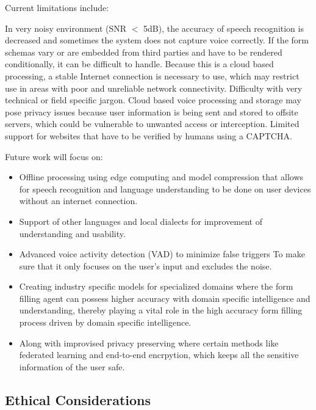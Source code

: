 \documentclass[conference]{IEEEtran}
\begin{document}
Current limitations include:

\begin{itemize}
In very noisy environment (SNR $<$ 5dB), the accuracy of speech recognition is decreased and sometimes the system does not capture voice correctly.
If the form schemas vary or are embedded from third parties and have to be rendered conditionally, it can be difficult to handle.
Because this is a cloud based processing, a stable Internet connection is necessary to use, which may restrict use in areas with poor and unreliable network connectivity.
Difficulty with very technical or field specific jargon.
Cloud based voice processing and storage may pose privacy issues because user information is being sent and stored to offsite servers, which could be vulnerable to unwanted access or interception.
Limited support for websites that have to be verified by humans using a CAPTCHA.

\end{itemize}

Future work will focus on:

\begin{itemize}
\item Offline processing using edge computing and model compression that allows for speech recognition and language understanding to be done on user devices without an internet connection.
\item Support of other languages and local dialects for improvement of understanding and usability.
\item Advanced voice activity detection (VAD) to minimize false triggers To make sure that it only focuses on the user's input and excludes the noise.
\item Creating industry specific models for specialized domains where the form filling agent can possess higher accuracy with domain specific intelligence and understanding, thereby playing a vital role in the high accuracy form filling process driven by domain specific intelligence. 
\item Along with improvised privacy preserving where certain methods like federated learning and end-to-end encrpytion, which keeps all the sensitive information of the user safe.
\end{itemize}

\subsection{Ethical Considerations}
\end{document}
